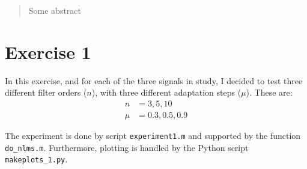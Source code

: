 \begin{abstract}
    Some abstract
\end{abstract}


\section{Exercise 1}\FloatBarrier

In this exercise, and for each of the three signals in study, I decided to test
three different filter orders (\(n\)), with three different adaptation steps
(\(\mu\)). These are:
\begin{equation}
    \begin{aligned}
        n   & = {3, 5, 10}      \\
        \mu & = {0.3, 0.5, 0.9}
    \end{aligned}
\end{equation}

The experiment is done by script {\tt experiment1.m} and supported by the function
    {\tt do\_nlms.m}. Furthermore, plotting is handled by the Python script {\tt
        makeplots\_1.py}.


